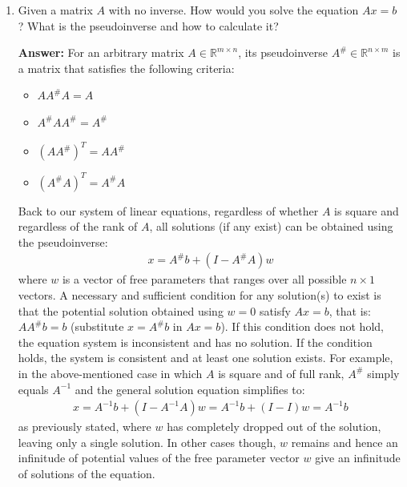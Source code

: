 \documentclass{article}
\newenvironment{QandA}{\begin{enumerate}[label=\arabic*.]}{\end{enumerate}}
\newenvironment{InnerQandA}{\begin{enumerate}[label=\roman*.]}{\end{enumerate}}
\newenvironment{answer}{\par\normalfont \textbf{Answer:}}{}
\newcommand{\R}{\mathbb{R}}
\begin{document}
\begin{QandA}
\begin{InnerQandA}
        \item Given a matrix $A$ with no inverse. How would you solve the equation $Ax=b$ ? What is the pseudoinverse and how to calculate it?
        \begin{answer}
            For an arbitrary matrix $A \in \R^{m \times n}$, its pseudoinverse $A^{\#} \in \R^{n \times m}$ is a matrix that satisfies the following criteria:
            \begin{itemize}
                \item $A A^{\#} A = A$
                \item $A^{\#} A A^{\#} = A^{\#}$
                \item $(A A^{\#})^T = A A^{\#}$
                \item $(A^{\#} A)^T = A^{\#} A$
            \end{itemize}
            Back to our system of linear equations, regardless of whether $A$ is square and regardless of the rank of $A$, all solutions (if any exist) can be obtained using the pseudoinverse:
            \begin{align*}
                x = A^{\#} b + (I - A^{\#}A)w
            \end{align*}
            where $w$ is a vector of free parameters that ranges over all possible $n \times 1$ vectors. A necessary and sufficient condition for any solution(s) to exist is that the potential solution obtained using $w=0$ satisfy $Ax = b$, that is: $A A^{\#}b = b$ (substitute $x = A^\# b$ in $Ax = b$). If this condition does not hold, the equation system is inconsistent and has no solution. If the condition holds, the system is consistent and at least one solution exists. For example, in the above-mentioned case in which $A$ is square and of full rank, $A^{\#}$ simply equals $A^{-1}$ and the general solution equation simplifies to:
            \begin{align*}
                x = A^{-1}b + (I - A^{-1}A)w = A^{-1}b + (I - I)w = A^{-1}b
            \end{align*}
            as previously stated, where $w$ has completely dropped out of the solution, leaving only a single solution. In other cases though, $w$ remains and hence an infinitude of potential values of the free parameter vector $w$ give an infinitude of solutions of the equation.
        \end{answer}
    \end{InnerQandA}
    

\end{QandA}
\end{document}
